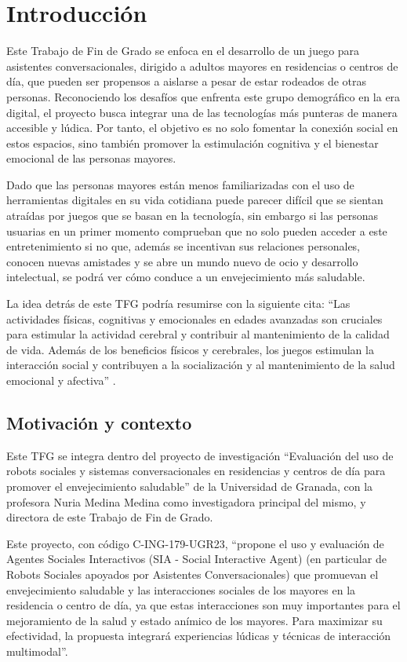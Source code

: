 \section{Introducción}
Este Trabajo de Fin de Grado se enfoca en el desarrollo de un juego para asistentes conversacionales, dirigido a adultos mayores en residencias o centros de día, que pueden ser propensos a aislarse a pesar de estar rodeados de otras personas. Reconociendo los desafíos que enfrenta este grupo demográfico en la era digital, el proyecto busca integrar una de las tecnologías más punteras de manera accesible y lúdica. Por tanto, el objetivo es no solo fomentar la conexión social en estos espacios, sino también promover la estimulación cognitiva y el bienestar emocional de las personas mayores.

Dado que las personas mayores están menos familiarizadas con el uso de herramientas digitales en su vida cotidiana puede parecer difícil que se sientan atraídas por juegos que se basan en la tecnología, sin embargo si las personas usuarias en un primer momento comprueban que no solo pueden acceder a este entretenimiento si no que, además se incentivan sus relaciones personales, conocen nuevas amistades y se abre un mundo nuevo de ocio y desarrollo intelectual, se podrá ver cómo conduce a un envejecimiento más saludable.

La idea detrás de este TFG podría resumirse con la siguiente cita: \enquote{Las actividades físicas, cognitivas y emocionales en edades avanzadas son cruciales para estimular la actividad cerebral y contribuir al mantenimiento de la calidad de vida. Además de los beneficios físicos y cerebrales, los juegos estimulan la interacción social y contribuyen a la socialización y al mantenimiento de la salud emocional y afectiva} \parencite{intro3}.


\subsection{Motivación y contexto}

Este TFG se integra dentro del proyecto de investigación \enquote{Evaluación del uso de robots sociales y sistemas conversacionales en residencias y centros de día para promover el envejecimiento saludable} de la Universidad de Granada, con  la profesora Nuria Medina Medina como investigadora principal del mismo, y directora de este Trabajo de Fin de Grado.

Este proyecto, con código C-ING-179-UGR23, \enquote{propone el uso y evaluación de Agentes Sociales Interactivos (SIA - Social Interactive Agent) (en particular de Robots Sociales apoyados por Asistentes Conversacionales) que promuevan el envejecimiento saludable y las interacciones sociales de los mayores en la residencia o centro de día, ya que estas interacciones son muy importantes para el mejoramiento de la salud y estado anímico de los mayores. Para maximizar su efectividad, la propuesta integrará experiencias lúdicas y técnicas de interacción multimodal}. 

